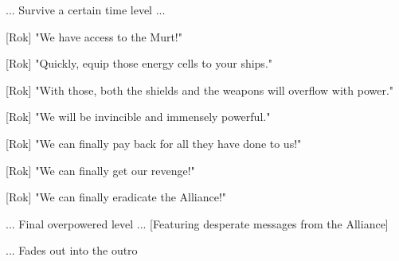 \documentclass[a4paper,12pt]{article}
\begin{document}
... Survive a certain time level ...

[Rok] "We have access to the Murt!" 

[Rok] "Quickly, equip those energy cells to your ships." 

[Rok] "With those, both the shields and the weapons will overflow with power." 

[Rok] "We will be invincible and immensely powerful."

[Rok] "We can finally pay back for all they have done to us!" 

[Rok] "We can finally get our revenge!"

[Rok] "We can finally eradicate the Alliance!"

... Final overpowered level ... [Featuring desperate messages from the Alliance]

... Fades out into the outro
\end{document}
